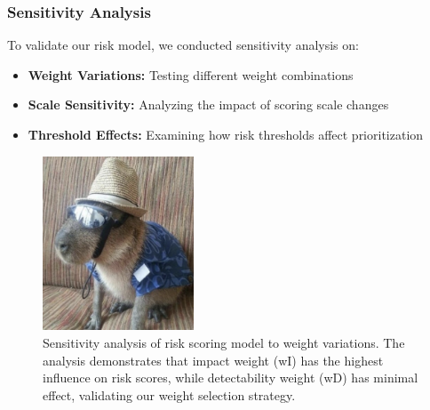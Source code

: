 \subsubsection{Sensitivity Analysis}
To validate our risk model, we conducted sensitivity analysis on:
\begin{itemize}
    \item \textbf{Weight Variations:} Testing different weight combinations
    \item \textbf{Scale Sensitivity:} Analyzing the impact of scoring scale changes
    \item \textbf{Threshold Effects:} Examining how risk thresholds affect prioritization
\end{itemize}


\begin{figure}[H]
\centering
\includegraphics[width=0.4\textwidth]{../figure/fig3.png}
\caption{Sensitivity analysis of risk scoring model to weight variations. The analysis demonstrates that impact weight (wI) has the highest influence on risk scores, while detectability weight (wD) has minimal effect, validating our weight selection strategy.}
\label{fig:sensitivity_analysis}
\end{figure}
